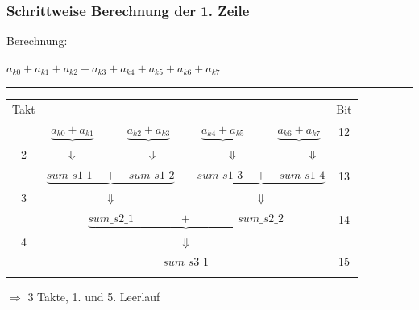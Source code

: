 \begin{frame}\frametitle{Schrittweise Berechnung der 1. Zeile}

Berechnung:
\begin{center}
$a_{k0} + a_{k1} + a_{k2} + a_{k3} + a_{k4} + a_{k5} + a_{k6} + a_{k7}$\\
\end{center}
\hrule
\vspace{0.5cm}

\begin{tabular}{ccccccccc}
Takt&\multicolumn{6}{l}{ } & & Bit\\
&$\underbrace{a_{k0} + a_{k1}}$ &  &$ \underbrace{a_{k2} + a_{k3}}$ &  &$\underbrace{a_{k4} + a_{k5}}$ &  &$\underbrace{a_{k6} + a_{k7}}$ & 12\\
2&\multicolumn{7}{l}{$\hspace{0.65cm} \Downarrow \hspace{2.3cm} \Downarrow \hspace{2.3cm} \Downarrow \hspace{2.3cm}\Downarrow$}&\\
&\multicolumn{3}{c}{$\underbrace{sum\_s1\_1 \quad + \quad sum\_s1\_2}$} & & \multicolumn{3}{c}{$\underbrace{sum\_s1\_3 \quad + \quad sum\_s1\_4}$} & 13\\
3&\multicolumn{3}{c}{$\Downarrow$} & & \multicolumn{3}{c}{$\Downarrow$}&\\
&\multicolumn{7}{c}{$\underbrace{sum\_s2\_1 \quad  \quad \quad \quad + \quad \quad \quad  \quad sum\_s2\_2}$} & 14\\
4&\multicolumn{7}{c}{$\Downarrow$}&\\
&\multicolumn{7}{c}{$sum\_s3\_1$} & 15\\
&\end{tabular}

\vspace{0.5cm}

$\Rightarrow$ 3 Takte, 1. und 5. Leerlauf

\end{frame}



